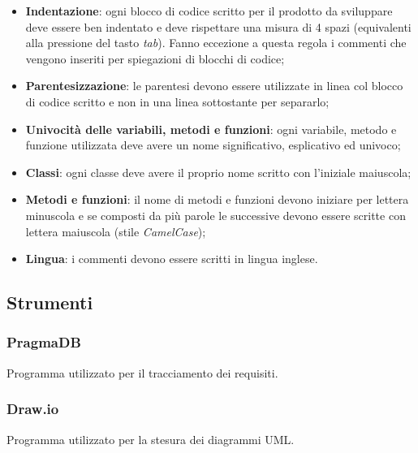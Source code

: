 \begin{itemize}
	\item \textbf{Indentazione}: ogni blocco di codice scritto per il prodotto da sviluppare deve essere ben indentato e deve rispettare una misura di 4 spazi (equivalenti alla pressione del tasto \textit{tab}). Fanno eccezione a questa regola i commenti che vengono inseriti per spiegazioni di blocchi di codice;
	\item \textbf{Parentesizzazione}: le parentesi devono essere utilizzate in linea col blocco di codice scritto e non in una linea sottostante per separarlo;
	\item \textbf{Univocità delle variabili, metodi e funzioni}: ogni variabile, metodo e funzione utilizzata deve avere un nome significativo, esplicativo ed univoco;
	\item \textbf{Classi}: ogni classe deve avere il proprio nome scritto con l'iniziale maiuscola;
	\item \textbf{Metodi e funzioni}: il nome di metodi e funzioni devono iniziare per lettera minuscola e se composti da più parole le successive devono essere scritte con lettera maiuscola (stile \textit{CamelCase});
	\item \textbf{Lingua}: i commenti devono essere scritti in lingua inglese.
\end{itemize}

\subsection{Strumenti}

\subsubsection{PragmaDB}
Programma utilizzato per il tracciamento dei requisiti.
\subsubsection{Draw.io}
Programma utilizzato per la stesura dei diagrammi UML.
